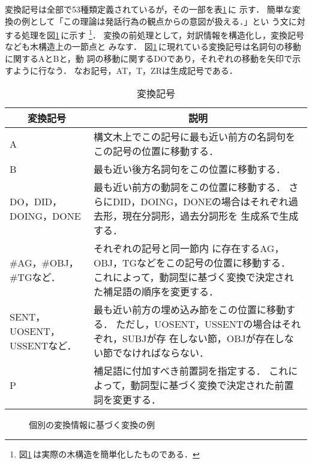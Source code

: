 変換記号は全部で53種類定義されているが，その一部を表\ref{tab:subst}\,に
示す．
簡単な変換の例として「この理論は発話行為の観点からの意図が扱える．」とい
う文に対する処理を図\ref{fig:subst}\,に示す
\footnote{図\ref{fig:subst}\,は実際の木構造を簡単化したものである．}．
変換の前処理として，対訳情報を構造化し，変換記号なども木構造上の一節点と
みなす．
図\ref{fig:subst}\,に現れている変換記号は名詞句の移動に関するAとBと，動
詞の移動に関するDOであり，それぞれの移動を矢印で示すように行なう．
なお記号，AT，T，ZRは生成記号である．
\begin{table}[tbhp]
\caption{変換記号}
\label{tab:subst}
\begin{center}
\begin{tabular}{|l||p{}|}\hline
\multicolumn{1}{|c||}{変換記号}&\multicolumn{1}{c|}{説明}
\\\hline\hline
A & 構文木上でこの記号に最も近い前方の名詞句をこの記号の位置に移動する．
\\\hline
B & 最も近い後方名詞句をこの位置に移動する．\\\hline
DO，DID，DOING，DONE &
最も近い前方の動詞をこの位置に移動する．
さらにDID，DOING，DONEの場合はそれぞれ過去形，現在分詞形，過去分詞形を
生成系で生成する．\\\hline
\#AG，\#OBJ，\#TGなど． & それぞれの記号と同一節内
に存在するAG，OBJ，TGなどをこの記号の位置に移動する．
これによって，動詞型に基づく変換で決定された補足語の順序を変更する．
\\\hline
SENT，UOSENT，USSENTなど． &
最も近い前方の埋め込み節をこの位置に移動する．
ただし，UOSENT，USSENTの場合はそれぞれ，SUBJが存
在しない節，OBJが存在しない節でなければならない．\\\hline
P & 補足語に付加すべき前置詞を指定する．
これによって，動詞型に基づく変換で決定された前置詞を変更する．\\\hline
\end{tabular}
\end{center}
\end{table}
\begin{figure}[tbhp]
\begin{center}
    \begin{epsf}
    \end{epsf}
    \begin{draft}
    \end{draft}
\end{center}
\caption{個別の変換情報に基づく変換の例}
\label{fig:subst}
\end{figure}

